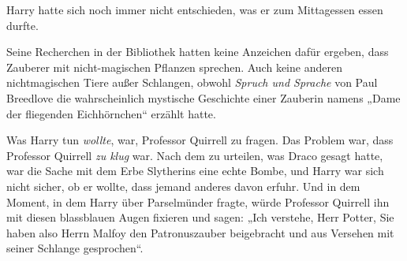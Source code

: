 Harry hatte sich noch immer nicht entschieden, was er zum Mittagessen essen durfte.

Seine Recherchen in der Bibliothek hatten keine Anzeichen dafür ergeben, dass Zauberer mit nicht-magischen Pflanzen sprechen. Auch keine anderen nichtmagischen Tiere außer Schlangen, obwohl \emph{Spruch und Sprache} von Paul Breedlove die wahrscheinlich mystische Geschichte einer Zauberin namens „Dame der fliegenden Eichhörnchen“ erzählt hatte.

Was Harry tun \emph{wollte}, war, Professor Quirrell zu fragen. Das Problem war, dass Professor Quirrell \emph{zu klug} war. Nach dem zu urteilen, was Draco gesagt hatte, war die Sache mit dem Erbe Slytherins eine echte Bombe, und Harry war sich nicht sicher, ob er wollte, dass jemand anderes davon erfuhr. Und in dem Moment, in dem Harry über Parselmünder fragte, würde Professor Quirrell ihn mit diesen blassblauen Augen fixieren und sagen: „Ich verstehe, Herr Potter, Sie haben also Herrn Malfoy den Patronuszauber beigebracht und aus Versehen mit seiner Schlange gesprochen“.

